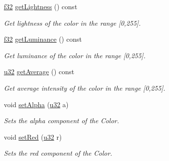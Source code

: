 \begin{DoxyCompactItemize}
\mbox{\label{classirr_1_1video_1_1SColor_aa0896808bbd22740a67f1badbebe1bca}} 
\hyperlink{namespaceirr_a0277be98d67dc26ff93b1a6a1d086b07}{f32} \hyperlink{classirr_1_1video_1_1SColor_aa0896808bbd22740a67f1badbebe1bca}{get\+Lightness} () const
\begin{DoxyCompactList}\small\item\em Get lightness of the color in the range \mbox{[}0,255\mbox{]}. \end{DoxyCompactList}\item 
\mbox{\label{classirr_1_1video_1_1SColor_a74510809a867a92c18696223e1130887}} 
\hyperlink{namespaceirr_a0277be98d67dc26ff93b1a6a1d086b07}{f32} \hyperlink{classirr_1_1video_1_1SColor_a74510809a867a92c18696223e1130887}{get\+Luminance} () const
\begin{DoxyCompactList}\small\item\em Get luminance of the color in the range \mbox{[}0,255\mbox{]}. \end{DoxyCompactList}\item 
\mbox{\label{classirr_1_1video_1_1SColor_a6a528306d2322e20c93aadc2debbd3d6}} 
\hyperlink{namespaceirr_a0416a53257075833e7002efd0a18e804}{u32} \hyperlink{classirr_1_1video_1_1SColor_a6a528306d2322e20c93aadc2debbd3d6}{get\+Average} () const
\begin{DoxyCompactList}\small\item\em Get average intensity of the color in the range \mbox{[}0,255\mbox{]}. \end{DoxyCompactList}\item 
void \hyperlink{classirr_1_1video_1_1SColor_a7bfe4abc30d563668b947c8bdb055bab}{set\+Alpha} (\hyperlink{namespaceirr_a0416a53257075833e7002efd0a18e804}{u32} a)
\begin{DoxyCompactList}\small\item\em Sets the alpha component of the Color. \end{DoxyCompactList}\item 
void \hyperlink{classirr_1_1video_1_1SColor_a950c98714711ae9dd8c5219f83c07693}{set\+Red} (\hyperlink{namespaceirr_a0416a53257075833e7002efd0a18e804}{u32} r)
\begin{DoxyCompactList}\small\item\em Sets the red component of the Color. \end{DoxyCompactList}\item 

\end{DoxyCompactItemize}
